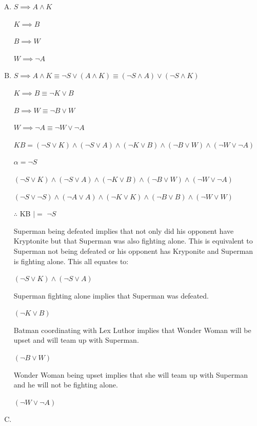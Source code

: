 \documentclass[10pt,a4paper]{article}
\begin{document}
	\begin{enumerate}[A.]	
	\item
	
	$S \implies A \land K$
	
	$K \implies B$
	
	$B \implies W$
	
	$W \implies \neg A$
	
	\item
	
	$S \implies A \land K \equiv \neg S \lor (A \land K) \equiv (\neg S \land A) \lor (\neg S \land K)$
	
	$K \implies B \equiv \neg K \lor B$
	
	$B \implies W \equiv \neg B \lor W$
	
	$W \implies \neg A \equiv \neg W \lor \neg A$
	
	
	
	
	\begin{center}
		$KB = (\neg S \lor K) \land (\neg S \lor A) \land (\neg K \lor B) \land (\neg B \lor W) \land (\neg W \lor \neg A)$
		
		$\alpha = \neg S$
	\end{center}
	
	\begin{center}
		$(\neg S \lor K) \land (\neg S \lor A) \land (\neg K \lor B) \land (\neg B \lor W) \land (\neg W \lor \neg A)$
		
		$(\neg S \lor \neg S) \land (\neg A \lor A) \land (\neg K \lor K) \land (\neg B \lor B) \land (\neg W \lor W)$
		
		$\therefore$ KB $|=$ $\neg S$
	\end{center}
	
	
	
	
	
	
	
	
	
	
	
	Superman being defeated implies that not only did his opponent have Kryptonite but that Superman was also fighting alone. This is equivalent to Superman not being defeated or his opponent has Kryponite and Superman is fighting alone. This all equates to: 
	\begin{center}
		$(\neg S \lor K) \land (\neg S \lor A)$
	\end{center}
	
	Superman fighting alone implies that Superman was defeated. 
	\begin{center}
		$(\neg K \lor B)$
	\end{center}
	Batman coordinating with Lex Luthor implies that Wonder Woman will be upset and will team up with Superman. 
	\begin{center}
		$(\neg B \lor W)$
	\end{center}
	Wonder Woman being upset implies that she will team up with Superman and he will not be fighting alone.
	\begin{center}
		$(\neg W \lor \neg A)$
	\end{center}
	\item
	

\end{enumerate}
\end{document}
